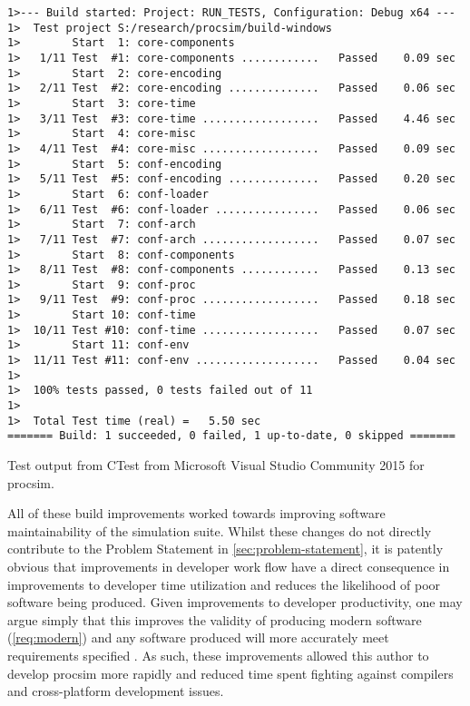 \begin{listing}[hb!]
\begin{verbatim}
1>--- Build started: Project: RUN_TESTS, Configuration: Debug x64 ---
1>  Test project S:/research/procsim/build-windows
1>        Start  1: core-components
1>   1/11 Test  #1: core-components ............   Passed    0.09 sec
1>        Start  2: core-encoding
1>   2/11 Test  #2: core-encoding ..............   Passed    0.06 sec
1>        Start  3: core-time
1>   3/11 Test  #3: core-time ..................   Passed    4.46 sec
1>        Start  4: core-misc
1>   4/11 Test  #4: core-misc ..................   Passed    0.09 sec
1>        Start  5: conf-encoding
1>   5/11 Test  #5: conf-encoding ..............   Passed    0.20 sec
1>        Start  6: conf-loader
1>   6/11 Test  #6: conf-loader ................   Passed    0.06 sec
1>        Start  7: conf-arch
1>   7/11 Test  #7: conf-arch ..................   Passed    0.07 sec
1>        Start  8: conf-components
1>   8/11 Test  #8: conf-components ............   Passed    0.13 sec
1>        Start  9: conf-proc
1>   9/11 Test  #9: conf-proc ..................   Passed    0.18 sec
1>        Start 10: conf-time
1>  10/11 Test #10: conf-time ..................   Passed    0.07 sec
1>        Start 11: conf-env
1>  11/11 Test #11: conf-env ...................   Passed    0.04 sec
1>
1>  100% tests passed, 0 tests failed out of 11
1>
1>  Total Test time (real) =   5.50 sec
======= Build: 1 succeeded, 0 failed, 1 up-to-date, 0 skipped =======
\end{verbatim}
\caption{Test output from CTest \cite{CMake:CTest} from Microsoft Visual Studio Community 2015 for procsim.}
\label{lst:lua:ctest-output}
\end{listing}  

All of these build improvements worked towards improving software maintainability of the simulation suite. Whilst these changes do not directly contribute to the Problem Statement in \cref{sec:problem-statement}, it is patently obvious that improvements in developer work flow have a direct consequence in improvements to developer time utilization and reduces the likelihood of poor software being produced. Given improvements to developer productivity, one may argue simply that this improves the validity of producing modern software (\cref{req:modern}) and any software produced will more accurately meet requirements specified \cite{Solis2011}. As such, these improvements allowed this author to develop procsim more rapidly and reduced time spent fighting against compilers and cross-platform development issues.

